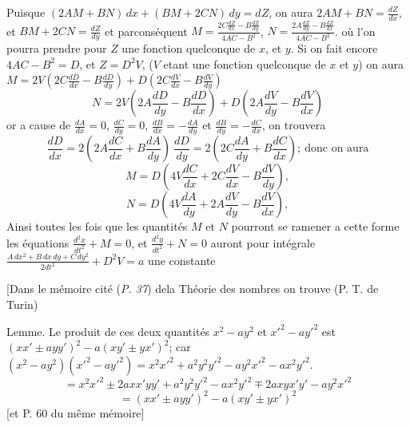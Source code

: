 \documentclass[11pt,a4paper]{article}
\begin{document}
Puisque $(2AM + BN)\,dx + (BM + 2CN)\,dy = dZ$, on aura $2AM + BN = \frac{dZ}{dx}$, et
$BM + 2CN = \frac{dZ}{dy}$ et parconséquent $M = \frac{2C\frac{dZ}{dx} - B\frac{dZ}{dy}}{4AC - B^{2}}$, $N = \frac{2A\frac{dZ}{dy} - B\frac{dZ}{dx}}{4AC - B^{2}}$.
où l'on pourra prendre pour $Z$ une fonction quelconque de $x$, et $y$.
Si on fait encore $4AC - B^{2} = D$, et $Z = D^{2}V$, ($V$ etant une fonction
quelconque de $x$ et $y$) on aura \quad $M = 2V\left(2C\frac{dD}{dx} - B\frac{dD}{dy}\right) + D\left(2C\frac{dV}{dx} - B\frac{dV}{dy}\right)$
\[ N = 2V\left(2A\frac{dD}{dy} - B\frac{dD}{dx}\right) + D\left(2A\frac{dV}{dy} - B\frac{dV}{dx}\right) \]
or a cause de $\frac{dA}{dx} = 0$, $\frac{dC}{dy} = 0$, $\frac{dB}{dx} = -\frac{dA}{dy}$ et $\frac{dB}{dy} = -\frac{dC}{dx}$, on trouvera
\[ \frac{dD}{dx} = 2\left(2A\frac{dC}{dx} + B\frac{dA}{dy}\right)\ \frac{dD}{dy} = 2\left(2C\frac{dA}{dy} + B\frac{dC}{dx}\right);\ \text{donc on aura} \]
\[ M = D\left(4V\frac{dC}{dx} + 2C\frac{dV}{dx} - B\frac{dV}{dy}\right), \]
\[ N = D\left(4V\frac{dA}{dy} + 2A\frac{dV}{dy} - B\frac{dV}{dx}\right), \]
Ainsi toutes les fois que les quantités $M$ et $N$ pourront se ramener a
cette forme les équations $\frac{d^{2}x}{dt^{2}} + M = 0$, et $\frac{d^{2}y}{dt^{2}} + N = 0$ auront pour
intégrale \quad $\frac{A\,dx^{2} + B\,dx\,dy + C\,dy^{2}}{2dt^{2}} + D^{2}V = a$ une constante

[Dans le mémoire cité (\emph{P. 37}) dela Théorie des nombres on trouve (P.  T.  de Turin)

Lemme. Le produit de ces deux quantités $x^{2} - ay^{2}$ et $x'^{2} - ay'^{2}$ est $(xx' \pm ayy')^{2} - a(xy' \pm yx')^{2}$;
car \quad $(x^{2} - ay^{2})(x'^{2} - ay'^{2}) = x^{2}x'^{2} + a^{2}y^{2}y'^{2} - ay^{2}x'^{2} - ax^{2}y'^{2}$.
\[ = x^{2}x'^{2} \pm 2axx'yy' + a^{2}y^{2}y'^{2} - ax^{2}y'^{2} \mp 2axyx'y' - ay^{2}x'^{2} \]
\[ = (xx' \pm ayy')^{2} - a(xy' \pm yx')^{2} \]
[et P. 60 du même mémoire]
\end{document}
